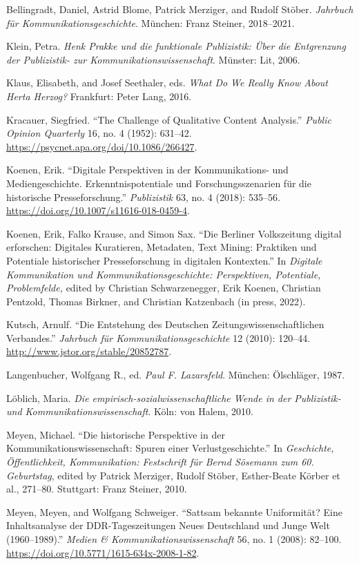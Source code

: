 \documentclass{tufte-handout}
\begin{document}
\begin{hangparas}{.25in}{1}
Bellingradt, Daniel, Astrid Blome, Patrick Merziger, and Rudolf Stöber.
\emph{Jahrbuch für Kommunikationsgeschichte}. München: Franz Steiner,
2018--2021.

Klein, Petra. \emph{Henk Prakke und die funktionale Publizistik: Über
die Entgrenzung der Publizistik- zur Kommunikationswissenschaft}.
Münster: Lit, 2006.

Klaus, Elisabeth, and Josef Seethaler, eds. \emph{What Do We Really Know
About Herta Herzog?} Frankfurt: Peter Lang, 2016.

Kracauer, Siegfried. ``The Challenge of Qualitative Content Analysis.''
\emph{Public Opinion Quarterly} 16, no. 4 (1952): 631--42.
\url{https://psycnet.apa.org/doi/10.1086/266427}.

Koenen, Erik. ``Digitale Perspektiven in der Kommunikations- und
Mediengeschichte. Erkenntnispotentiale und Forschungsszenarien für die
historische Presseforschung.'' \emph{Publizistik} 63, no. 4 (2018):
535--56. \url{https://doi.org/10.1007/s11616-018-0459-4}.

Koenen, Erik, Falko Krause, and Simon Sax. ``Die Berliner Volkszeitung
digital erforschen: Digitales Kuratieren, Metadaten, Text Mining:
Praktiken und Potentiale historischer Presseforschung in digitalen
Kontexten.'' In \emph{Digitale Kommunikation und
Kommunikationsgeschichte: Perspektiven, Potentiale, Problemfelde,}
edited by Christian Schwarzenegger, Erik Koenen, Christian Pentzold,
Thomas Birkner, and Christian Katzenbach (in press, 2022).

Kutsch, Arnulf. ``Die Entstehung des Deutschen
Zeitungswissenschaftlichen Verbandes.'' \emph{Jahrbuch für
Kommunikationsgeschichte} 12 (2010): 120--44.
\url{http://www.jstor.org/stable/20852787}.

Langenbucher, Wolfgang R., ed. \emph{Paul F. Lazarsfeld}. München:
Ölschläger, 1987.

Löblich, Maria. \emph{Die empirisch-sozialwissenschaftliche Wende in der
Publizistik- und Kommunikationswissenschaft}. Köln: von Halem, 2010.

Meyen, Michael. ``Die historische Perspektive in der
Kommunikationswissenschaft: Spuren einer Verlustgeschichte.'' In
\emph{Geschichte, Öffentlichkeit, Kommunikation: Festschrift für Bernd
Sösemann zum 60. Geburtstag}, edited by Patrick Merziger, Rudolf Stöber,
Esther-Beate Körber et al., 271--80. Stuttgart: Franz Steiner, 2010.

Meyen, Meyen, and Wolfgang Schweiger. ``Sattsam bekannte Uniformität?
Eine Inhaltsanalyse der DDR-Tageszeitungen Neues Deutschland und Junge
Welt (1960--1989).'' \emph{Medien \& Kommunikationswissenschaft} 56, no.
1 (2008): 82--100. \url{https://doi.org/10.5771/1615-634x-2008-1-82}.


\end{hangparas}
\end{document}
